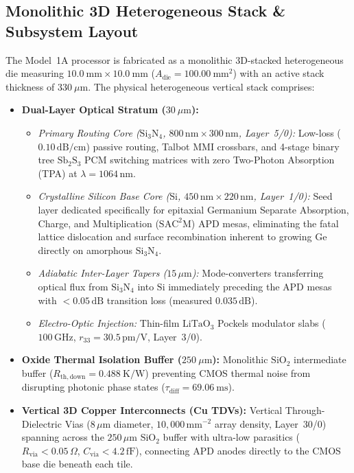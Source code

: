 \documentclass[journal]{IEEEtran}
\begin{document}
\subsection{Monolithic 3D Heterogeneous Stack \& Subsystem Layout}
The Model~1A processor is fabricated as a monolithic 3D-stacked heterogeneous die measuring $10.0~\mathrm{mm} \times 10.0~\mathrm{mm}$ ($A_{\mathrm{die}} = 100.00~\mathrm{mm^2}$) with an active stack thickness of $330~\mu\mathrm{m}$. The physical heterogeneous vertical stack comprises:
\begin{itemize}
    \item \textbf{Dual-Layer Optical Stratum ($30~\mu\mathrm{m}$):} 
    \begin{itemize}
        \item \emph{Primary Routing Core ($\mathrm{Si_3N_4}$, $800\,\mathrm{nm} \times 300\,\mathrm{nm}$, Layer~5/0):} Low-loss ($0.10\,\mathrm{dB/cm}$) passive routing, Talbot MMI crossbars, and 4-stage binary tree $\mathrm{Sb_2S_3}$ PCM switching matrices with zero Two-Photon Absorption (TPA) at $\lambda = 1064\,\mathrm{nm}$.
        \item \emph{Crystalline Silicon Base Core ($\mathrm{Si}$, $450\,\mathrm{nm} \times 220\,\mathrm{nm}$, Layer~1/0):} Seed layer dedicated specifically for epitaxial Germanium Separate Absorption, Charge, and Multiplication ($\mathrm{SAC^2M}$) APD mesas, eliminating the fatal lattice dislocation and surface recombination inherent to growing Ge directly on amorphous $\mathrm{Si_3N_4}$.
        \item \emph{Adiabatic Inter-Layer Tapers ($15\,\mu\mathrm{m}$):} Mode-converters transferring optical flux from $\mathrm{Si_3N_4}$ into $\mathrm{Si}$ immediately preceding the APD mesas with $<0.05\,\mathrm{dB}$ transition loss (measured $0.035\,\mathrm{dB}$).
        \item \emph{Electro-Optic Injection:} Thin-film $\mathrm{LiTaO_3}$ Pockels modulator slabs ($100\,\mathrm{GHz}$, $r_{33} = 30.5\,\mathrm{pm/V}$, Layer~3/0).
    \end{itemize}
    \item \textbf{Oxide Thermal Isolation Buffer ($250~\mu\mathrm{m}$):} Monolithic $\mathrm{SiO_2}$ intermediate buffer ($R_{\mathrm{th,down}} = 0.488~\mathrm{K/W}$) preventing CMOS thermal noise from disrupting photonic phase states ($\tau_{\mathrm{diff}} = 69.06~\mathrm{ms}$).
    \item \textbf{Vertical 3D Copper Interconnects (Cu TDVs):} Vertical Through-Dielectric Vias ($8\,\mu\mathrm{m}$ diameter, $10,000\,\mathrm{mm^{-2}}$ array density, Layer~30/0) spanning across the $250\,\mu\mathrm{m}$ $\mathrm{SiO_2}$ buffer with ultra-low parasitics ($R_{\mathrm{via}} < 0.05\,\Omega$, $C_{\mathrm{via}} < 4.2\,\mathrm{fF}$), connecting APD anodes directly to the CMOS base die beneath each tile.

\end{itemize}
\end{document}
